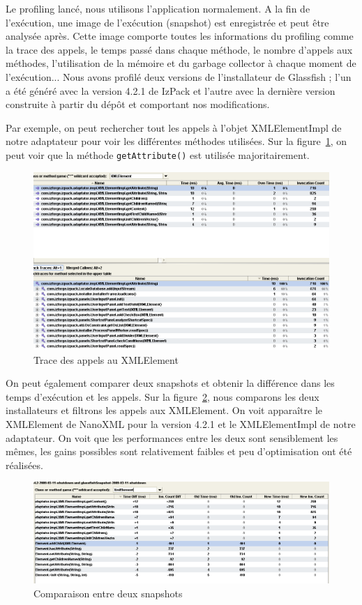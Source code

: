 Le profiling lancé, nous utilisons l'application normalement.
A la fin de l'exécution, une image de l'exécution (snapshot) est enregistrée et peut être analysée après.
Cette image comporte toutes les informations du profiling comme la trace des appels, le temps passé dans chaque méthode, le nombre d'appels aux méthodes, l'utilisation de la mémoire et du garbage collector à chaque moment de l'exécution...
Nous avons profilé deux versions de l'installateur de Glassfish ; l'un a été généré avec la version 4.2.1 de IzPack et l'autre avec la dernière version construite à partir du dépôt et comportant nos modifications.

Par exemple, on peut rechercher tout les appels à l'objet XMLElementImpl de notre adaptateur pour voir les différentes méthodes utilisées. Sur la figure~\ref{fig:yourkitXmlElement}, on peut voir que la méthode \verb|getAttribute()| est utilisée majoritairement.
\begin{figure}[H]
	\centering
	\includegraphics[width=1\textwidth]{../image/yourkitXmlElement.png}
	\caption{Trace des appels au XMLElement}
	\label{fig:yourkitXmlElement}
\end{figure}

On peut également comparer deux snapshots et obtenir la différence dans les temps d'exécution et les appels.
Sur la figure~\ref{fig:yourkitComparaison}, nous comparons les deux installateurs et filtrons les appels aux XMLElement.
On voit apparaître le XMLElement de NanoXML pour la version 4.2.1 et le XMLElementImpl de notre adaptateur.
On voit que les performances entre les deux sont sensiblement les mêmes, les gains possibles sont relativement faibles et peu d'optimisation ont été réalisées.
\begin{figure}[H]
	\centering
	\includegraphics[width=1\textwidth]{../image/yourkitComparaison.png}
	\caption{Comparaison entre deux snapshots}
	\label{fig:yourkitComparaison}
\end{figure}

